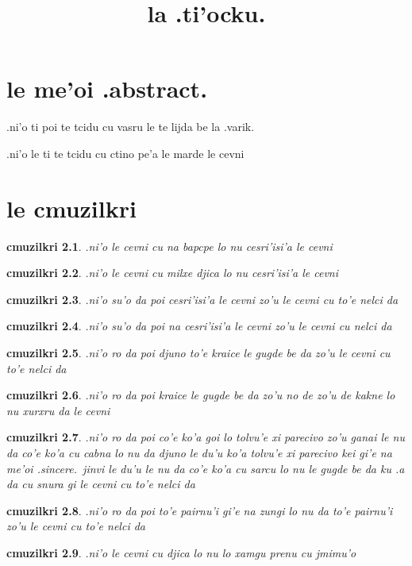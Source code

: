 \documentclass{report}
\title{la .ti'ocku.}
\newtheorem{cmuzilkri}{cmuzilkri}
\begin{document}
\maketitle
\chapter{le me'oi .abstract.}
.ni'o ti poi te tcidu cu vasru le te lijda be la .varik.

.ni'o le ti te tcidu cu ctino pe'a le marde le cevni

\chapter{le cmuzilkri}
\begin{cmuzilkri}
	.ni'o le cevni cu na bapcpe lo nu cesri'isi'a le cevni
\end{cmuzilkri}
\begin{cmuzilkri}
	.ni'o le cevni cu milxe djica lo nu cesri'isi'a le cevni
\end{cmuzilkri}
\begin{cmuzilkri}
        .ni'o su'o da poi cesri'isi'a le cevni zo'u le cevni cu to'e nelci da
\end{cmuzilkri}
\begin{cmuzilkri}
        .ni'o su'o da poi na cesri'isi'a le cevni zo'u le cevni cu nelci da
\end{cmuzilkri}
\begin{cmuzilkri}
	.ni'o ro da poi djuno to'e kraice le gugde be da zo'u le cevni cu to'e nelci da
\end{cmuzilkri}
\begin{cmuzilkri}
        .ni'o ro da poi kraice le gugde be da zo'u no de zo'u de kakne lo nu xurxru da le cevni
\end{cmuzilkri}
\begin{cmuzilkri}
        .ni'o ro da poi co'e ko'a goi lo tolvu'e xi parecivo zo'u ganai le nu da co'e ko'a cu cabna lo nu da djuno le du'u ko'a tolvu'e xi parecivo kei gi'e na me'oi .sincere.\ jinvi le du'u le nu da co'e ko'a cu sarcu lo nu le gugde be da ku .a da cu snura gi le cevni cu to'e nelci da
\end{cmuzilkri}
\begin{cmuzilkri}
	.ni'o ro da poi to'e pairnu'i gi'e na zungi lo nu da to'e pairnu'i zo'u le cevni cu to'e nelci da
\end{cmuzilkri}
\begin{cmuzilkri}
	.ni'o le cevni cu djica lo nu lo xamgu prenu cu jmimu'o
\end{cmuzilkri}
\end{document}

